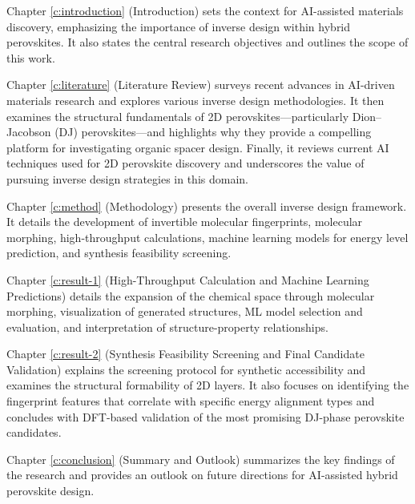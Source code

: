 Chapter \ref{c:introduction} (Introduction) sets the context for AI-assisted materials discovery, emphasizing the importance of inverse design within hybrid perovskites. It also states the central research objectives and outlines the scope of this work.

Chapter \ref{c:literature} (Literature Review) surveys recent advances in AI-driven materials research and explores various inverse design methodologies. It then examines the structural fundamentals of 2D perovskites—particularly Dion–Jacobson (DJ) perovskites—and highlights why they provide a compelling platform for investigating organic spacer design. Finally, it reviews current AI techniques used for 2D perovskite discovery and underscores the value of pursuing inverse design strategies in this domain.

Chapter \ref{c:method} (Methodology) presents the overall inverse design framework. It details the development of invertible molecular fingerprints, molecular morphing, high-throughput calculations, machine learning models for energy level prediction, and synthesis feasibility screening.

Chapter \ref{c:result-1} (High-Throughput Calculation and Machine Learning Predictions) details the expansion of the chemical space through molecular morphing, visualization of generated structures, ML model selection and evaluation, and interpretation of structure-property relationships.

Chapter \ref{c:result-2} (Synthesis Feasibility Screening and Final Candidate Validation) explains the screening protocol for synthetic accessibility and examines the structural formability of 2D layers. It also focuses on identifying the fingerprint features that correlate with specific energy alignment types and concludes with DFT-based validation of the most promising DJ-phase perovskite candidates.

Chapter \ref{c:conclusion} (Summary and Outlook) summarizes the key findings of the research and provides an outlook on future directions for AI-assisted hybrid perovskite design.









